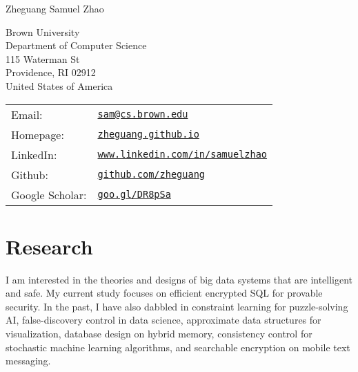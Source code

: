 \documentclass[letterpaper]{article}
\def\name{Zheguang Samuel Zhao}
\begin{document}
{\huge \name}


\vspace{0.25in}

\begin{minipage}{0.45\linewidth}
  Brown University \\
  Department of Computer Science \\
  115 Waterman St \\
  Providence, RI 02912 \\
  United States of America
\end{minipage}
\begin{minipage}{0.45\linewidth}
  \begin{tabular}{ll}
    Email: & \href{mailto:sam@cs.brown.edu}{\tt sam@cs.brown.edu} \\
    Homepage: & \href{https://zheguang.github.io}{\tt zheguang.github.io} \\
    LinkedIn: & \href{https://www.linkedin.com/in/samuelzhao}{\tt www.linkedin.com/in/samuelzhao} \\
    Github: & \href{https://github.com/zheguang}{\tt github.com/zheguang} \\
    Google Scholar: & \href{https://goo.gl/DR8pSa}{\tt goo.gl/DR8pSa} \\
  \end{tabular}
\end{minipage}


\section*{Research}

I am interested in the theories and designs of big data systems that are intelligent and safe.  
My current study focuses on efficient encrypted SQL for provable security.  
In the past, I have also dabbled in constraint learning for puzzle-solving AI, false-discovery control in data science, approximate data structures for visualization, database design on hybrid memory, consistency control for stochastic machine learning algorithms, and searchable encryption on mobile text messaging. 
\end{document}
